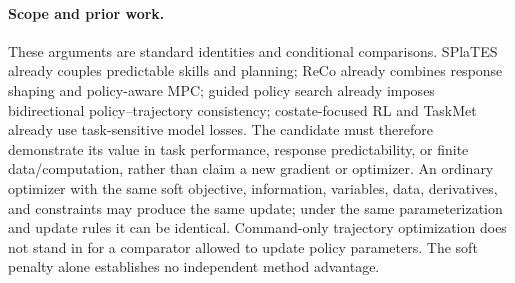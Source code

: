 \paragraph{Scope and prior work.}
These arguments are standard identities and conditional comparisons.
SPlaTES already couples predictable skills and planning; ReCo already
combines response shaping and policy-aware MPC; guided policy search
already imposes bidirectional policy--trajectory consistency;
costate-focused RL and TaskMet already use task-sensitive model losses.
The candidate must therefore demonstrate its value in task performance,
response predictability, or finite data/computation, rather than claim a
new gradient or optimizer. An ordinary optimizer with the same soft
objective, information, variables, data, derivatives, and constraints may
produce the same update; under the same parameterization and update
rules it can be identical. Command-only trajectory optimization does not
stand in for a comparator allowed to update policy parameters. The soft
penalty alone establishes no independent method advantage.
